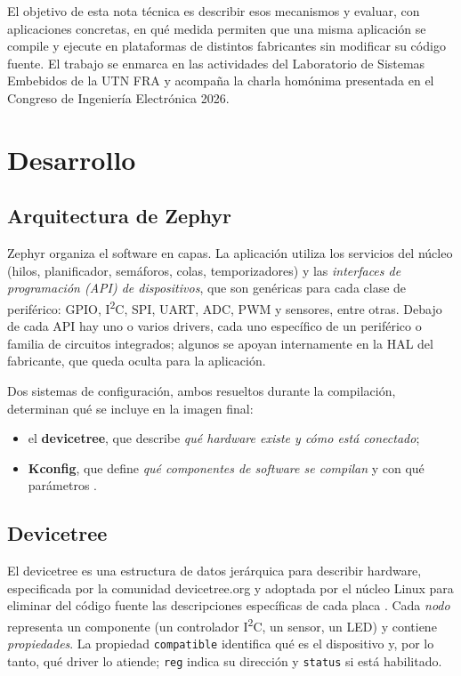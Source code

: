 El objetivo de esta nota técnica es describir esos mecanismos y evaluar, con aplicaciones concretas, en qué medida permiten que una misma aplicación se compile y ejecute en plataformas de distintos fabricantes sin modificar su código fuente. El trabajo se enmarca en las actividades del Laboratorio de Sistemas Embebidos de la UTN FRA y acompaña la charla homónima presentada en el Congreso de Ingeniería Electrónica 2026.

\section{Desarrollo}

\subsection{Arquitectura de Zephyr}

Zephyr organiza el software en capas. La aplicación utiliza los servicios del núcleo (hilos, planificador, semáforos, colas, temporizadores) y las \emph{interfaces de programación (API) de dispositivos}, que son genéricas para cada clase de periférico: GPIO, I\textsuperscript{2}C, SPI, UART, ADC, PWM y sensores, entre otras. Debajo de cada API hay uno o varios drivers, cada uno específico de un periférico o familia de circuitos integrados; algunos se apoyan internamente en la HAL del fabricante, que queda oculta para la aplicación.

Dos sistemas de configuración, ambos resueltos durante la compilación, determinan qué se incluye en la imagen final:
\begin{itemize}
    \item el \textbf{devicetree}, que describe \emph{qué hardware existe y cómo está conectado};
    \item \textbf{Kconfig}, que define \emph{qué componentes de software se compilan} y con qué parámetros \cite{zephyr_kconfig}.
\end{itemize}

\subsection{Devicetree}

El devicetree es una estructura de datos jerárquica para describir hardware, especificada por la comunidad devicetree.org \cite{dtspec} y adoptada por el núcleo Linux para eliminar del código fuente las descripciones específicas de cada placa \cite{linux_dt_usage}. Cada \emph{nodo} representa un componente (un controlador I\textsuperscript{2}C, un sensor, un LED) y contiene \emph{propiedades}. La propiedad \texttt{compatible} identifica qué es el dispositivo y, por lo tanto, qué driver lo atiende; \texttt{reg} indica su dirección y \texttt{status} si está habilitado.

